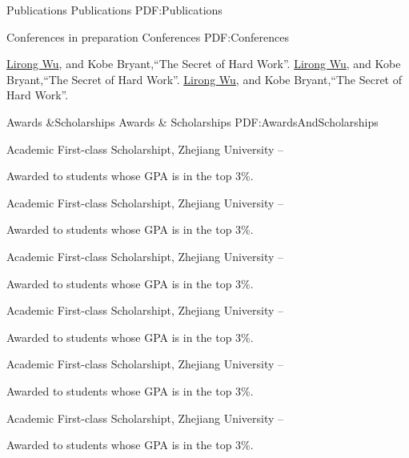 \documentclass[letterpaper,MMMyyyy,nonstopmode]{simpleresumecv}
\begin{document}
\begin{Body}
	
\Section
{Publications}
{Publications}
{PDF:Publications}
		
\SubSection
{Conferences in preparation}
{Conferences}
{PDF:Conferences}
		
\begingroup
\renewcommand{\MaxNumberedItem}{[8888]}
\NumberedItem{[1]}
{\underline{Lirong Wu}, and Kobe Bryant,``The Secret of Hard Work''.}
\NumberedItem{[2]}
{\underline{Lirong Wu}, and Kobe Bryant,``The Secret of Hard Work''.}
\NumberedItem{[3]}
{\underline{Lirong Wu}, and Kobe Bryant,``The Secret of Hard Work''.}
\endgroup
		

\Section
{Awards \&\newline Scholarships}
{Awards \& Scholarships}
{PDF:AwardsAndScholarships}

\BulletItem
Academic First-class Scholarshipt,
Zhejiang University
\hfill
{} --
\begin{Detail}
	\Item
	Awarded to students whose GPA is in the top 3\%.
\end{Detail}

\BulletItem
Academic First-class Scholarshipt,
Zhejiang University
\hfill
{} --
\begin{Detail}
	\Item
	Awarded to students whose GPA is in the top 3\%.
\end{Detail}
	
\BulletItem
Academic First-class Scholarshipt,
Zhejiang University
\hfill
{} --
\begin{Detail}
	\Item
	Awarded to students whose GPA is in the top 3\%.
\end{Detail}

\BulletItem
Academic First-class Scholarshipt,
Zhejiang University
\hfill
{} --
\begin{Detail}
	\Item
	Awarded to students whose GPA is in the top 3\%.
\end{Detail}

\BulletItem
Academic First-class Scholarshipt,
Zhejiang University
\hfill
{} --
\begin{Detail}
	\Item
	Awarded to students whose GPA is in the top 3\%.
\end{Detail}

\BulletItem
Academic First-class Scholarshipt,
Zhejiang University
\hfill
{} --
\begin{Detail}
	\Item
	Awarded to students whose GPA is in the top 3\%.
\end{Detail}


\end{Body}
\end{document}
